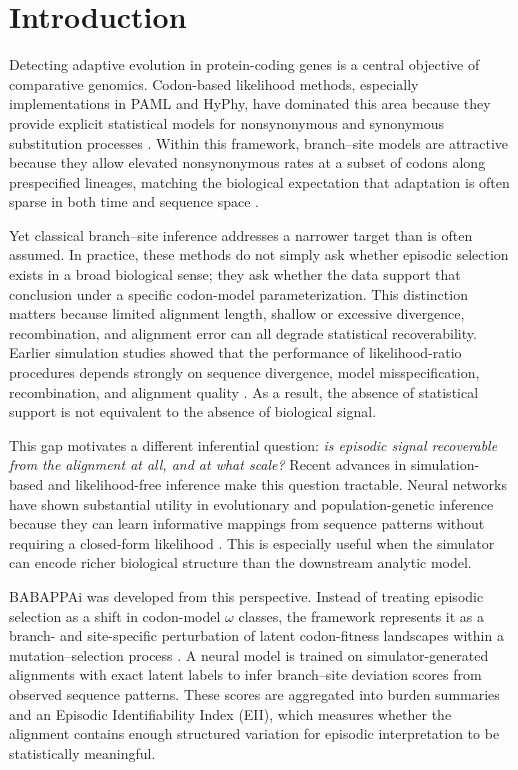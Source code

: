 \documentclass[11pt]{article}
\begin{document}
\section{Introduction}

Detecting adaptive evolution in protein-coding genes is a central objective of comparative genomics. Codon-based likelihood methods, especially implementations in PAML and HyPhy, have dominated this area because they provide explicit statistical models for nonsynonymous and synonymous substitution processes \cite{Yang2007,Murrell2012,KosakovskyPond2020}. Within this framework, branch--site models are attractive because they allow elevated nonsynonymous rates at a subset of codons along prespecified lineages, matching the biological expectation that adaptation is often sparse in both time and sequence space \cite{AnisimovaYang2007,YangDosReis2011,KosakovskyPond2011}.

Yet classical branch--site inference addresses a narrower target than is often assumed. In practice, these methods do not simply ask whether episodic selection exists in a broad biological sense; they ask whether the data support that conclusion under a specific codon-model parameterization. This distinction matters because limited alignment length, shallow or excessive divergence, recombination, and alignment error can all degrade statistical recoverability. Earlier simulation studies showed that the performance of likelihood-ratio procedures depends strongly on sequence divergence, model misspecification, recombination, and alignment quality \cite{Anisimova2001,Wong2004,FletcherYang2010,JordanGoldman2012,Anisimova2003}. As a result, the absence of statistical support is not equivalent to the absence of biological signal.

This gap motivates a different inferential question: \emph{is episodic signal recoverable from the alignment at all, and at what scale?} Recent advances in simulation-based and likelihood-free inference make this question tractable. Neural networks have shown substantial utility in evolutionary and population-genetic inference because they can learn informative mappings from sequence patterns without requiring a closed-form likelihood \cite{SheehanSong2016,Flagel2019,Cranmer2020}. This is especially useful when the simulator can encode richer biological structure than the downstream analytic model.

BABAPPAi was developed from this perspective. Instead of treating episodic selection as a shift in codon-model $\omega$ classes, the framework represents it as a branch- and site-specific perturbation of latent codon-fitness landscapes within a mutation--selection process \cite{HalpernBruno1998}. A neural model is trained on simulator-generated alignments with exact latent labels to infer branch--site deviation scores from observed sequence patterns. These scores are aggregated into burden summaries and an Episodic Identifiability Index (EII), which measures whether the alignment contains enough structured variation for episodic interpretation to be statistically meaningful.
\end{document}

